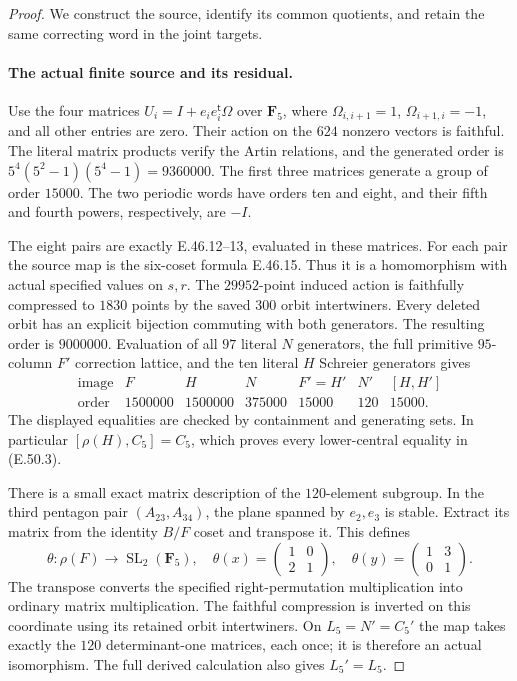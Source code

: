 \begin{proof}
We construct the source, identify its common quotients,
and retain the same correcting word in the joint targets.

\paragraph{The actual finite source and its residual.}
Use the four matrices
$U_i=I+e_i e_i^{\mathsf t}\Omega$ over $\mathbf F_5$,
where $\Omega_{i,i+1}=1$, $\Omega_{i+1,i}=-1$, and
all other entries are zero.  Their action on the $624$
nonzero vectors is faithful.  The literal matrix products
verify the Artin relations, and the generated order is
$5^4(5^2-1)(5^4-1)=9360000$.
The first three matrices generate a group of order $15000$.
The two periodic words have orders ten and eight, and
their fifth and fourth powers, respectively, are $-I$.

The eight pairs are exactly E.46.12--13, evaluated in
these matrices.  For each pair the source map is the
six-coset formula E.46.15.  Thus it is a homomorphism
with actual specified values on $s,r$.
The $29952$-point induced action is faithfully compressed
to $1830$ points by the saved $300$ orbit intertwiners.
Every deleted orbit has an explicit bijection commuting
with both generators.  The resulting order is $9000000$.
Evaluation of all $97$ literal $N$ generators, the full
primitive $95$-column $F'$ correction lattice, and the
ten literal $H$ Schreier generators gives
\[
 \begin{array}{c|rrrrrr}
  \text{image}&F&H&N&F'=H'&N'&[H,H']\\ \hline
  \text{order}&1500000&1500000&375000&15000&120&15000.
 \end{array}
 \tag{E.50.7}
\]
The displayed equalities are checked by containment
and generating sets.  In particular $[\rho(H),C_5]=C_5$,
which proves every lower-central equality in
\textup{(E.50.3)}.

There is a small exact matrix description of the
$120$-element subgroup.  In the third pentagon pair
$(A_{23},A_{34})$, the plane spanned by $e_2,e_3$ is
stable.  Extract its matrix from the identity $B/F$
coset and transpose it.  This defines
\[
 \theta:\rho(F)\longrightarrow\operatorname{SL}_2(\mathbf F_5),
 \quad
 \theta(x)=\begin{pmatrix}1&0\\2&1\end{pmatrix},
 \quad
 \theta(y)=\begin{pmatrix}1&3\\0&1\end{pmatrix}.
 \tag{E.50.8}
\]
The transpose converts the specified right-permutation
multiplication into ordinary matrix multiplication.
The faithful compression is inverted on this coordinate
using its retained orbit intertwiners.  On $L_5=N'=C_5'$
the map takes exactly the $120$ determinant-one matrices,
each once; it is therefore an actual isomorphism.
The full derived calculation also gives $L_5'=L_5$.


\end{proof}
